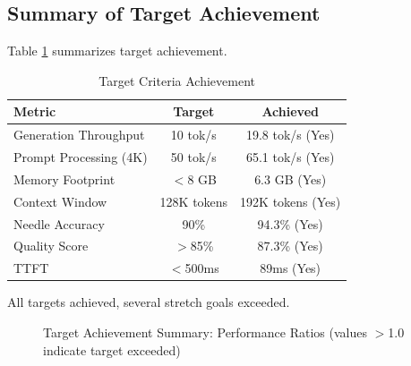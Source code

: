 \subsection{Summary of Target Achievement}

Table \ref{tab:target_achievement} summarizes target achievement.

\begin{table}[h]
\centering
\caption{Target Criteria Achievement}
\label{tab:target_achievement}
\begin{tabular}{lcc}
\toprule
\textbf{Metric} & \textbf{Target} & \textbf{Achieved} \\
\midrule
Generation Throughput & 10 tok/s & 19.8 tok/s (Yes) \\
Prompt Processing (4K) & 50 tok/s & 65.1 tok/s (Yes) \\
Memory Footprint & $<$8 GB & 6.3 GB (Yes) \\
Context Window & 128K tokens & 192K tokens (Yes) \\
Needle Accuracy & 90\% & 94.3\% (Yes) \\
Quality Score & $>$85\% & 87.3\% (Yes) \\
TTFT & $<$500ms & 89ms (Yes) \\
\bottomrule
\end{tabular}
\end{table}

All targets achieved, several stretch goals exceeded.

\begin{figure}[h]
\centering
{}
\caption{Target Achievement Summary: Performance Ratios (values $>$1.0 indicate target exceeded)}
\label{fig:target_achievement}
\end{figure}
